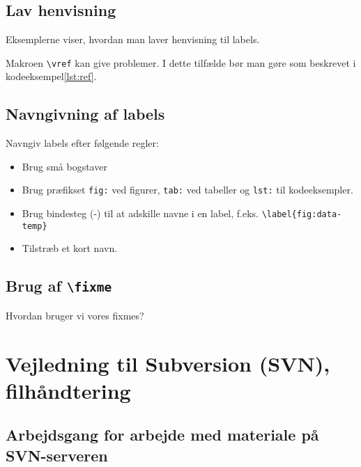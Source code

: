 \documentclass[simple,final]{../mypaper}
\begin{document}
\section{Lav henvisning}

Eksemplerne viser, hvordan man laver henvisning til labels.



Makroen \texttt{\textbackslash vref} kan give problemer. I dette tilfælde
bør man gøre som beskrevet i kodeeksempel\vref{lst:ref}.




\section{Navngivning af labels}

Navngiv labels efter følgende regler:

\begin{itemize}
\item Brug små bogstaver
\item Brug præfikset \texttt{fig:} ved figurer, \texttt{tab:} ved
  tabeller og \texttt{lst:} til kodeeksempler.
\item Brug bindesteg (-) til at adskille navne i en label,
  f.eks. \texttt{\textbackslash label\{fig:data-temp\}}
\item Tilstræb et kort navn.
\end{itemize}


\section{Brug af \texttt{\textbackslash fixme}}

Hvordan bruger vi vores fixmes?


\chapter{Vejledning til Subversion (SVN), filhåndtering}

\section{Arbejdsgang for arbejde med materiale på SVN-serveren}
\end{document}
